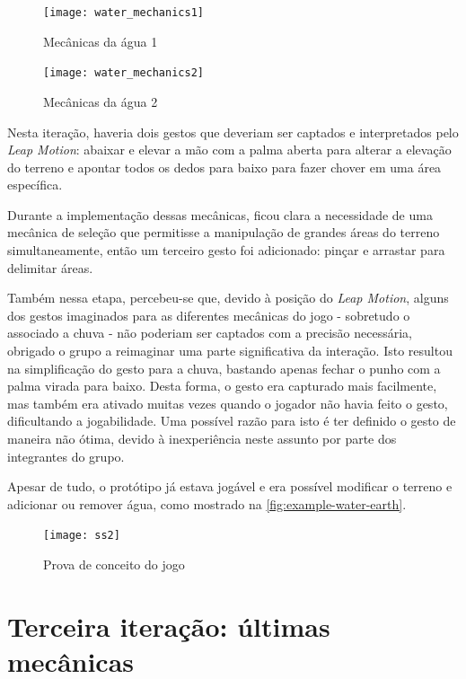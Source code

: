 \begin{figure}[ht]
	\centering
	\caption{Mecânicas da água 1}
	\texttt{[image: water\_mechanics1]}
	\legend{\fonteAP}
	\label{fig:mecanica-agua-enchendo-graficamente}
\end{figure}

\begin{figure}[ht]
	\centering
	\caption{Mecânicas da água 2}
	\texttt{[image: water\_mechanics2]}
	\legend{\fonteAP}
	\label{fig:mecanica-agua-enchendo-mecanica}
\end{figure}

Nesta iteração, haveria dois gestos que deveriam ser captados e interpretados 
pelo \textit{Leap Motion}: abaixar e elevar a mão com a palma aberta para alterar 
a elevação do terreno e apontar todos os dedos para baixo para fazer chover em 
uma área específica.

Durante a implementação dessas mecânicas, ficou clara a necessidade de uma 
mecânica de seleção que permitisse a manipulação de grandes áreas do terreno
simultaneamente, então um terceiro gesto foi adicionado: pinçar e arrastar 
para delimitar áreas.

Também nessa etapa, percebeu-se que, devido à posição do \textit{Leap Motion},
alguns dos gestos imaginados para as diferentes mecânicas do jogo - sobretudo 
o associado a chuva - não poderiam ser captados com a precisão necessária, 
obrigado o grupo a reimaginar uma parte significativa da interação. Isto 
resultou na simplificação do gesto para a chuva, bastando apenas fechar o punho
com a palma virada para baixo. Desta forma, o gesto era capturado mais facilmente,
mas também era ativado muitas vezes quando o jogador não havia feito o gesto, 
dificultando a jogabilidade. Uma possível razão para isto é ter definido o 
gesto de maneira não ótima, devido à inexperiência neste assunto por parte
dos integrantes do grupo.

Apesar de tudo, o protótipo já estava jogável e era possível modificar 
o terreno e adicionar ou remover água, como mostrado 
na \autoref{fig:example-water-earth}.

\begin{figure}[ht]
	\centering
	\caption{Prova de conceito do jogo}
	\texttt{[image: ss2]}
	\legend{\fonteAP}
	\label{fig:example-water-earth}
\end{figure}

\section{Terceira iteração: últimas mecânicas}\label{sec-terceira-iteracao-ultimas-mecanicas}

